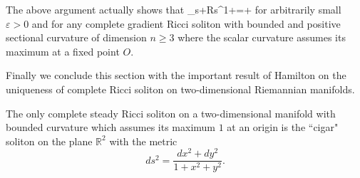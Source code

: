 The above argument actually shows that \be
\limsup_{s\rightarrow+\infty}Rs^{1+\varepsilon}=+\infty
\ee for arbitrarily small $\varepsilon>0$ and for any complete
gradient Ricci soliton with bounded and positive sectional
curvature of dimension $n\ge3$ where the scalar curvature assumes
its maximum at a fixed point $O$.

Finally we conclude this section with the important result of
Hamilton on the uniqueness of complete Ricci soliton on
two-dimensional Riemannian manifolds.

\begin{theorem}
  \label{thm:cz-classification-of-two-dimensional-steady-solitons}
The only complete steady Ricci soliton on a two-dimensional
manifold with bounded curvature which assumes its maximum $1$ at
an origin is the ``cigar" soliton on the plane $\mathbb{R}^2$ with
the metric
$$
ds^2=\frac{dx^2+dy^2}{1+x^2+y^2}.
$$
\end{theorem}

